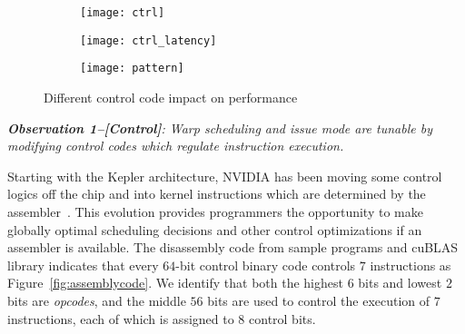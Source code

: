 \begin{figure*}
    \begin{subfigure}[htbp]{0.3\textwidth}
        \texttt{[image: ctrl]}
        \label{fig:control_throughput}
    \end{subfigure}
    \begin{subfigure}[htbp]{0.3\textwidth}
        \texttt{[image: ctrl\_latency]}
        \label{fig:control_latency}
    \end{subfigure}
    \begin{subfigure}[htbp]{0.3\textwidth}
        \texttt{[image: pattern]}
        \label{fig:control_pattern}
    \end{subfigure}
    \caption{Different control code impact on performance}
    \label{fig:control_code}
\end{figure*}


{\em {\bf Observation 1--[Control]}: 
Warp scheduling and issue mode are tunable by modifying control codes which regulate instruction execution.}

Starting with the Kepler architecture, NVIDIA has been moving some control logics off the chip and into kernel 
instructions which are determined by the assembler~\cite{lai,maxas}. This evolution provides programmers the opportunity to 
make globally optimal scheduling decisions and other control optimizations if an assembler is available. The disassembly code from sample programs and cuBLAS library indicates that every $64$-bit control binary code controls  $7$ instructions as Figure~\ref{fig:assemblycode}.
We identify that both the highest $6$ bits and lowest 
$2$ bits are {\em opcodes}, and the middle $56$ bits are used to control the execution of $7$ 
instructions, each of which is assigned to $8$ control bits.

